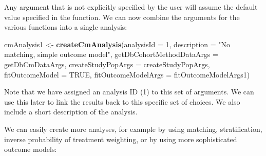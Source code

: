 \documentclass[
]{article}
\newenvironment{Shaded}{\begin{snugshade}}{\end{snugshade}}
\newcommand{\DataTypeTok}[1]{\textcolor[rgb]{0.13,0.29,0.53}{#1}}
\newcommand{\DecValTok}[1]{\textcolor[rgb]{0.00,0.00,0.81}{#1}}
\newcommand{\KeywordTok}[1]{\textcolor[rgb]{0.13,0.29,0.53}{\textbf{#1}}}
\newcommand{\NormalTok}[1]{#1}
\newcommand{\OtherTok}[1]{\textcolor[rgb]{0.56,0.35,0.01}{#1}}
\newcommand{\StringTok}[1]{\textcolor[rgb]{0.31,0.60,0.02}{#1}}
\begin{document}
Any argument that is not explicitly specified by the user will assume
the default value specified in the function. We can now combine the
arguments for the various functions into a single analysis:

\begin{Shaded}
\begin{Highlighting}[]
\NormalTok{cmAnalysis1 <-}\StringTok{ }\KeywordTok{createCmAnalysis}\NormalTok{(}\DataTypeTok{analysisId =} \DecValTok{1}\NormalTok{,}
                                \DataTypeTok{description =} \StringTok{"No matching, simple outcome model"}\NormalTok{,}
                                \DataTypeTok{getDbCohortMethodDataArgs =}\NormalTok{ getDbCmDataArgs,}
                                \DataTypeTok{createStudyPopArgs =}\NormalTok{ createStudyPopArgs,}
                                \DataTypeTok{fitOutcomeModel =} \OtherTok{TRUE}\NormalTok{,}
                                \DataTypeTok{fitOutcomeModelArgs =}\NormalTok{ fitOutcomeModelArgs1)}
\end{Highlighting}
\end{Shaded}

Note that we have assigned an analysis ID (1) to this set of arguments.
We can use this later to link the results back to this specific set of
choices. We also include a short description of the analysis.

We can easily create more analyses, for example by using matching,
stratification, inverse probability of treatment weighting, or by using
more sophisticated outcome models:
\end{document}
